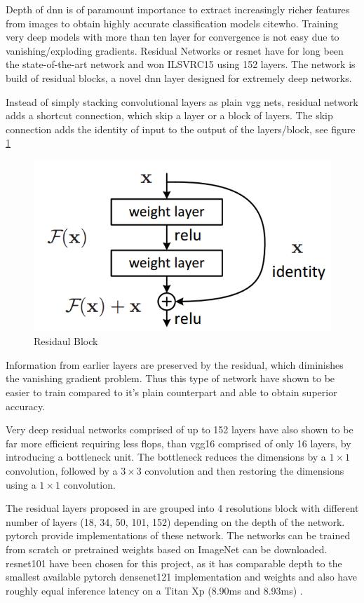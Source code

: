 Depth of \gls{dnn} is of paramount importance to extract increasingly richer features from images to obtain highly accurate classification models cite{who}. Training very deep models with more than ten layer for convergence is not easy due to vanishing/exploding gradients. Residual Networks or \gls{resnet} \cite{he_deep_2015} have for long been the state-of-the-art network and won ILSVRC15 using 152 layers. The network is build of residual blocks, a novel \gls{dnn} layer designed for extremely deep networks. 

Instead of simply stacking convolutional layers as plain \gls{vgg} nets, residual network adds a shortcut connection, which skip a layer or a block of layers. The skip connection adds the identity of input to the output of the layers/block, see figure \ref{fig:residualblock}

\begin{figure}
	\centering
	\includegraphics[width=.5\linewidth]{figures/models/residualblock}
	\caption[Residual Block]{Residaul Block}
	\label{fig:residualblock}
\end{figure}

Information from earlier layers are preserved by the residual, which diminishes the vanishing gradient problem. Thus this type of network have shown to be easier to train compared to it’s plain counterpart and able to obtain superior accuracy.  

Very deep residual networks comprised of up to 152 layers have also shown to be far more efficient requiring less \gls{flop}s, than \gls{vgg}16 comprised of only 16 layers, by introducing a bottleneck unit. The bottleneck reduces the dimensions by a $1 \times 1$ convolution, followed by a $3 \times 3$ convolution and then restoring the dimensions using a $1 \times 1$ convolution. 

The residual layers proposed in \cite{he_deep_2015} are grouped into 4 resolutions block with different number of layers (18, 34, 50, 101, 152) depending on the depth of the network. \gls{pytorch} provide implementations of these network. The networks can be trained from scratch or pretrained weights based on ImageNet can be downloaded. \gls{resnet}101 have been chosen for this project, as it has comparable depth to the smallest available \gls{pytorch} \gls{densenet}121 implementation and weights and also have roughly equal inference latency on a Titan Xp (8.90ms and 8.93ms) \cite{bianco_benchmark_2018}.



